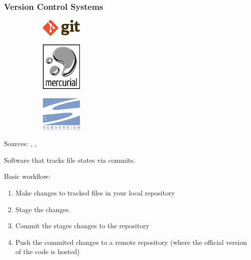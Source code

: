 \begin{frame}
    \frametitle{Version Control Systems}
    \begin{figure}[htpb]
        \begin{subfigure}
        \centering
            \includegraphics[width=2cm]{images/git-logo.eps}
        \end{subfigure}
        \hspace{1cm}
        \begin{subfigure}
        \centering
            \includegraphics[width=2cm]{images/mercurial-logo.eps}
        \end{subfigure}
        \hspace{1cm}
        \begin{subfigure}
        \centering
            \includegraphics[width=2cm]{images/subversion-logo.eps}
        \end{subfigure}
    \end{figure}
    \begin{center}
        {\tiny Sources: \cite{git_logo}, \cite{mercurial_logo}, \cite{subversion_logo}}
    \end{center}

    Software that tracks file states via commits.

    Basic workflow:
    \begin{enumerate}
        \item Make changes to tracked files in your local repository
        \item Stage the changes.
        \item Commit the stages changes to the repository
        \item Push the commited changes to a remote repository (where the official version of the code is hosted)
    \end{enumerate}
\end{frame}

